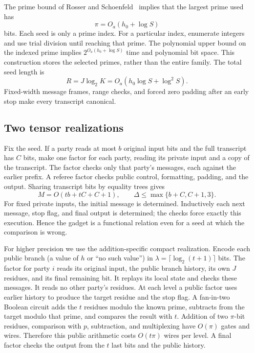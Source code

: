 The prime bound of Rosser and Schoenfeld~\cite{Rosser62} implies that
the largest prime used has
\begin{equation}\label{eq:prime-bits}
 \pi=O_a(h_0+\log S)
\end{equation}
bits. Each seed is only a prime index. For a particular index,
enumerate integers and use trial division until reaching that prime.
The polynomial upper bound on the indexed prime implies
$2^{O_a(h_0+\log S)}$ time and polynomial bit space. This construction
stores the selected primes, rather than the entire family. The total
seed length is
\begin{equation}\label{eq:seedlength}
 R=J\log_2K=O_a(h_0\log S+\log^2S).
\end{equation}
Fixed-width message frames, range checks, and forced zero padding
after an early stop make every transcript canonical.

\subsection{Two tensor realizations}

Fix the seed. If a party reads at most $b$ original input bits and
the full transcript has $C$ bits, make one factor for each party,
reading its private input and a copy of the transcript. The factor
checks only that party's messages, each against the earlier prefix.
A referee factor checks public control, formatting, padding, and the
output. Sharing transcript bits by equality trees gives
\begin{equation}\label{eq:full-transcript}
 M=O(tb+tC+C+1),\qquad
 \Delta\le\max\{b+C,C+1,3\}.
\end{equation}
For fixed private inputs, the initial message is determined. Inductively
each next message, stop flag, and final output is determined; the
checks force exactly this execution. Hence the gadget is a functional
relation even for a seed at which the comparison is wrong.

For higher precision we use the addition-specific compact
realization. Encode each public branch (a value of $h$ or ``no such
value'') in $\lambda=\lceil\log_2(t+1)\rceil$ bits. The factor for
party $i$ reads its original input, the public branch history, its own
$J$ residues, and its final remaining bit. It replays its local
state and checks these messages. It reads no other party's residues.
At each level a public factor uses earlier history to produce the
target residue and the stop flag. A fan-in-two Boolean circuit adds
the $t$ residues modulo the known prime, subtracts from the target
modulo that prime, and compares the result with $t$. Addition of two
$\pi$-bit residues, comparison with $p$, subtraction, and multiplexing
have $O(\pi)$ gates and wires. Therefore this public arithmetic costs
$O(t\pi)$ wires per level. A final factor checks the output from the
$t$ last bits and the public history.

